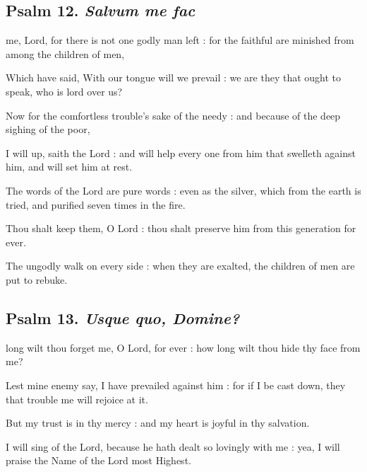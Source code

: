 \subsection{Psalm 12. \textit{Salvum me fac}}

 me, Lord, for there is not one godly man left : for the faithful are minished from among the children of men,\par
{}
Which have said, With our tongue will we prevail : we are they that ought to speak, who is lord over us?\par
{}Now for the comfortless trouble's sake of the needy : and because of the deep sighing of the poor,\par
{}I will up, saith the Lord : and will help every one from him that swelleth against him, and will set him at rest.\par
{}The words of the Lord are pure words : even as the silver, which from the earth is tried, and purified seven times in the fire.\par
{}Thou shalt keep them, O Lord : thou shalt preserve him from this generation for ever.\par
{}The ungodly walk on every side : when they are exalted, the children of men are put to rebuke.\par

\clearpage
\subsection{Psalm 13. \textit{Usque quo, Domine?}}

 long wilt thou forget me, O Lord, for ever : how long wilt thou hide thy face from me?\par
{}
Lest mine enemy say, I have prevailed against him : for if I be cast down, they that trouble me will rejoice at it.\par
{}But my trust is in thy mercy : and my heart is joyful in thy salvation.\par
{}I will sing of the Lord, because he hath dealt so lovingly with me : yea, I will praise the Name of the Lord most Highest.\par

